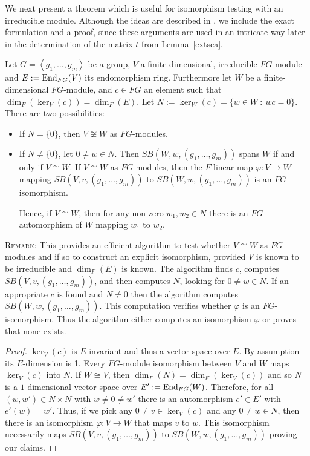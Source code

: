 We next present a theorem which is useful for isomorphism testing with
an irreducible module. Although the ideas are described in
\cite[Section 6]{MeatAxeRP}, we include the exact formulation and a proof,
since these arguments are used in an intricate way later in the
determination of the matrix $t$ from Lemma~\ref{extsca}.

\begin{Theo}
\label{isotest}
%
Let $G=\left< g_1, \ldots, g_m\right>$ be a group, $V$ a finite-dimensional,
irreducible $FG$-module and 
$E := \End_{FG}(V)$ its endomorphism ring. Furthermore let 
$W$ be a finite-dimensional $FG$-module, 
and
$c \in FG$ an element such that $\dim_F(\ker_V(c)) = \dim_F(E)$. 
Let $N := \ker_W(c) = \{w \in W \ : \ wc = 0\}$. There are two possibilities:

\begin{itemize}
\item If $N = \{0\}$, then $V \not\cong W$ as $FG$-modules. 

\item If $N \neq \{0\}$,  let $0 \neq w \in N$. 
Then $SB(W,w,(g_1, \ldots, g_m))$ spans $W$ if and only if 
$V \cong W$. If $V \cong W$ as $FG$-modules, then the $F$-linear
map $\varphi : V \to W$ mapping $SB(V,v,(g_1, \ldots, g_m))$ to
$SB(W,w,(g_1, \ldots, g_m))$ is an $FG$-isomorphism.

Hence, if $V \cong W$, then for any non-zero $w_1, w_2 \in N$ there is an 
$FG$-automorphism of $W$ mapping $w_1$ to $w_2$.
\end{itemize}
\end{Theo}

\noindent\textsc{Remark:} 
This provides an efficient algorithm to test
whether $V \cong W$ as $FG$-modules and if so to construct an explicit
isomorphism, provided $V$ is known to be irreducible and $\dim_F(E)$ is known.
 The algorithm finds $c$, 
computes $SB(V,v,(g_1, \ldots, g_m))$, and then computes
$N$, looking for $0 \neq w \in N$. 
If an appropriate $c$ is found and $N \neq 0$ then the algorithm computes
$SB(W,w,(g_1, \ldots, g_m))$. This computation verifies
whether $\varphi$ is an $FG$-isomorphism. Thus the algorithm
either computes an isomorphism $\varphi$ or proves that none exists.

\smallskip
\begin{proof}
$\ker_V(c)$ is $E$-invariant and thus
a vector space over $E$. By assumption its $E$-dimension is 1. 
Every $FG$-module isomorphism between $V$ and $W$ maps
$\ker_V(c)$ into $N$. If $W \cong V$, then
$\dim_F(N) = \dim_F(\ker_V(c))$ and so $N$ is a $1$-dimensional
vector space over $E' := \End_{FG}(W)$. Therefore, for all
$(w,w') \in N \times N$ with $w \neq 0 \neq w'$ there is an
automorphism $e' \in E'$ with $e'(w)=w'$. Thus, if we pick
any $0 \neq v \in \ker_V(c)$ and any $0 \neq w \in N$, then there
is an isomorphism $\varphi : V \to W$ that maps $v$ to $w$. This
isomorphism necessarily maps $SB(V,v,(g_1, \ldots, g_m))$ to
$SB(W,w,(g_1,\ldots,g_m))$ proving our claims.
\end{proof}

